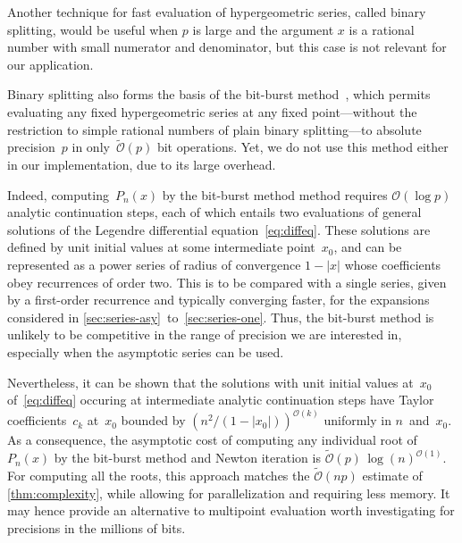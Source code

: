 \documentclass[nohypdvips,review]{siamart0216}
\newcommand{\OO}{\mathcal{O}}
\newcommand{\OOtilde}{\widetilde{\mathcal{O}}}
\begin{document}
Another technique for fast evaluation of hypergeometric series,
called binary splitting, would be useful when $p$ is large and the
argument $x$ is a rational number with small numerator and denominator,
but this case is not relevant for our application.

Binary splitting also forms the basis of the bit-burst
method~\cite[Section 4]{ChudnovskyChudnovsky1990}, which permits
evaluating any fixed hypergeometric series at any fixed point---without
the restriction to simple rational numbers of plain binary
splitting---to absolute precision~$p$ in only~$\OOtilde(p)$ bit
operations.
Yet, we do not use this method either in our implementation, due to its
large overhead.

Indeed, computing~$P_n(x)$ by the bit-burst method method requires
$\OO(\log p)$ analytic continuation steps, each of which entails
two evaluations of general solutions of the Legendre differential
equation~\cref{eq:diffeq}.
These solutions are defined by unit initial values at some intermediate
point~$x_0$, and can be represented as a power series of radius of
convergence $1 - |x|$ whose coefficients obey recurrences of order two.
This is to be compared with a single series, given by a first-order
recurrence and typically converging faster, for the expansions
considered in \cref{sec:series-asy}~to~\cref{sec:series-one}.
Thus, the bit-burst method is unlikely to be competitive in the range
of precision we are interested in, especially when the asymptotic
series can be used.

Nevertheless, it can be shown that the solutions with unit initial
values at~$x_0$ of~\cref{eq:diffeq} occuring at intermediate analytic
continuation steps have Taylor coefficients~$c_k$ at~$x_0$ bounded by
$(n^2/(1-|x_0|))^{\OO(k)}$
uniformly in $n$~and~$x_0$.
As a consequence, the asymptotic cost of computing any individual root
of $P_n(x)$ by the bit-burst method and Newton iteration is
$\OOtilde(p) \, \log(n)^{\OO(1)}$.
For computing all the roots, this approach matches the $\OOtilde(np)$
estimate of \cref{thm:complexity}, while allowing for
parallelization and requiring less memory.
It may hence provide an alternative to multipoint
evaluation
worth investigating for precisions in the millions of bits.
\end{document}
